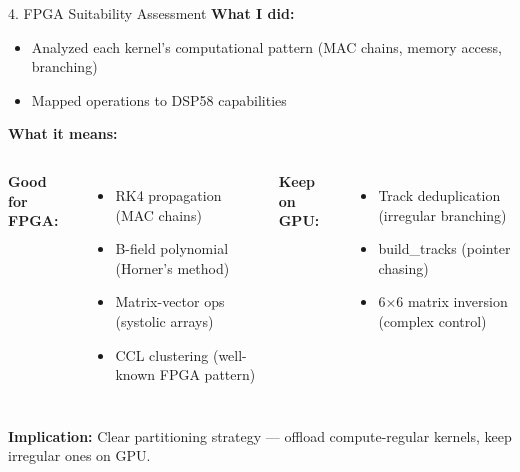\documentclass[aspectratio=169, table]{beamer}
\begin{document}
\begin{frame}{4. FPGA Suitability Assessment}
\textbf{What I did:}
\begin{itemize}
    \item Analyzed each kernel's computational pattern (MAC chains, memory access, branching)
    \item Mapped operations to DSP58 capabilities
\end{itemize}

\vspace{0.5em}
\textbf{What it means:}
\begin{columns}
\textbf{Good for FPGA:}
\begin{itemize}
    \item RK4 propagation (MAC chains)
    \item B-field polynomial (Horner's method)
    \item Matrix-vector ops (systolic arrays)
    \item CCL clustering (well-known FPGA pattern)
\end{itemize}

\textbf{Keep on GPU:}
\begin{itemize}
    \item Track deduplication (irregular branching)
    \item build\_tracks (pointer chasing)
    \item 6$\times$6 matrix inversion (complex control)
\end{itemize}
\end{columns}

\vspace{0.5em}
\textbf{Implication:} Clear partitioning strategy --- offload compute-regular kernels, keep irregular ones on GPU.
\end{frame}
\end{document}
